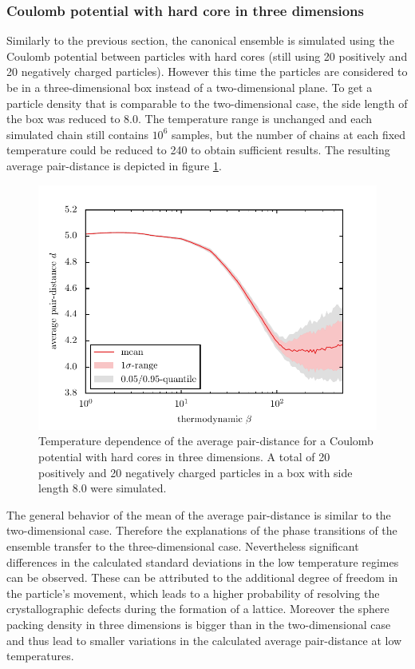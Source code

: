 \documentclass[11pt, a4paper]{article}
\numberwithin{equation}{section}
\begin{document}
\subsubsection{Coulomb potential with hard core in three dimensions}
Similarly to the previous section, the canonical ensemble is simulated using the Coulomb potential between particles with hard cores (still using 20 positively and 20 negatively charged particles).
However this time the particles are considered to be in a three-dimensional box instead of a two-dimensional plane.
To get a particle density that is comparable to the two-dimensional case, the side length of the box was reduced to \num{8.0}.
The temperature range is unchanged and each simulated chain still contains $10^6$ samples, but the number of chains at each fixed temperature could be reduced to \num{240} to obtain sufficient results.
The resulting average pair-distance is depicted in figure \ref{fig:temp_dep_cou3d}.
\begin{figure}[h]
	\centering
	\includegraphics{./figures/temp_dep_coulomb3d.pdf}
	\caption{Temperature dependence of the average pair-distance for a Coulomb potential with hard cores in three dimensions.
		A total of 20 positively and 20 negatively charged particles in a box with side length 8.0 were simulated.}
	\label{fig:temp_dep_cou3d}
\end{figure}

The general behavior of the mean of the average pair-distance is similar to the two-dimensional case.
Therefore the explanations of the phase transitions of the ensemble transfer to the three-dimensional case.
Nevertheless significant differences in the calculated standard deviations in the low temperature regimes can be observed.
These can be attributed to the additional degree of freedom in the particle's movement, which leads to a higher probability of resolving the crystallographic defects during the formation of a lattice.
Moreover the sphere packing density in three dimensions is bigger than in the two-dimensional case and thus lead to smaller variations in the calculated average pair-distance at low temperatures.
\end{document}
